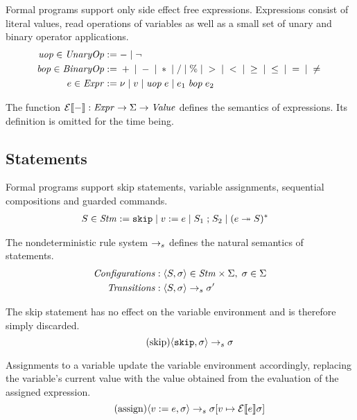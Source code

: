 \documentclass{article}
\begin{document}
Formal programs support only side effect free expressions. Expressions consist of literal values, read operations of variables as
well as a small set of unary and binary operator applications.
\begin{align*}
	\mathit{uop} \in \mathit{UnaryOp} & := - \mid \neg
	\\
    \mathit{bop} \in \mathit{BinaryOp} & := {} + {} \mid {} - {} \mid {} \ast {} \mid {} / {}
                       \mid {} \% {} \mid {} > {} \mid {} < {} \mid {} \geq {} 
                       \mid {} \leq {} \mid {} = {} \mid {} \neq {}
	\\
	e \in \mathit{Expr} & := 
		\nu \mid v \mid
		\mathit{uop}\; e \mid
		e_1 \;\mathit{bop}\; e_2
\end{align*}

The function $\mathcal{E} \llbracket - \rrbracket : \mathit{Expr} \rightarrow \Sigma \rightarrow \mathit{Value}$ defines the semantics of
expressions.
Its definition is omitted for the time being.

\subsection{Statements}

Formal programs support skip statements, variable assignments, sequential compositions and guarded commands.
\begin{align*}
	S \in \mathit{Stm} & :=
		\mathtt{skip} \mid 
		v\; \mathtt{:=}\; e \mid 
		S_1 \; \mathtt{;} \; S_2 \mid
		(e \; \mathtt{\twoheadrightarrow} \; S)^*
\end{align*}

The nondeterministic rule system $\rightarrow_s$ defines the natural semantics of statements.
\begin{align*}
	\mathit{Configurations} : & \;\langle S, \sigma \rangle \in \mathit{Stm} \times \Sigma, \; \sigma \in \Sigma
	\\
	\mathit{Transitions} : & \;\langle S, \sigma \rangle \rightarrow_s \sigma'
\end{align*}

The skip statement has no effect on the variable environment and is therefore simply discarded.
\begin{equation*}
	\tag{skip}
	\langle \mathtt{skip}, \sigma \rangle
		\rightarrow_s
	\sigma
\end{equation*}

Assignments to a variable update the variable environment accordingly, replacing the variable's current value with the value
obtained from the evaluation of the assigned expression.
\begin{equation*}
	\tag{assign}
	\langle v\; \mathtt{:=}\; e, \sigma \rangle
		\rightarrow_s
	\sigma[v \mapsto \mathcal{E} \llbracket e \rrbracket \sigma]
\end{equation*}
\end{document}
